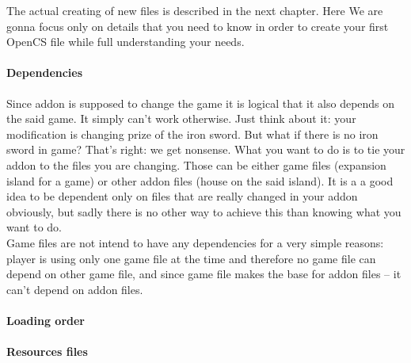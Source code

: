 
The actual creating of new files is described in the next chapter. Here We are gonna focus only on details that you need to know in order to create your first Open{CS} file while full understanding your needs.

\paragraph{Dependencies}
Since addon is supposed to change the game it is logical that it also depends on the said game. It simply can't work otherwise. Just think about it: your modification is changing prize of the iron sword. But what if there is no iron sword in game? That's right: we get nonsense. What you want to do is to tie your addon to the files you are changing. Those can be either game files (expansion island for a game) or other addon files (house on the said island). It is a a good idea to be dependent only on files that are really changed in your addon obviously, but sadly there is no other way to achieve this than knowing what you want to do.\\

Game files are not intend to have any dependencies for a very simple reasons: player is using only one game file at the time and therefore no game file can depend on other game file, and since game file makes the base for addon files -- it can't depend on addon files.

\paragraph{Loading order}

\paragraph{Resources files}
